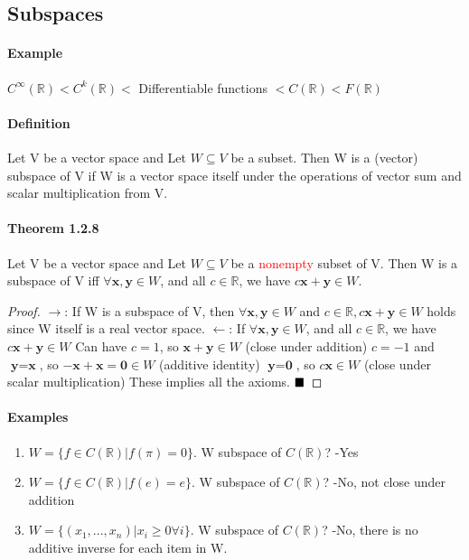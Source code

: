 \documentclass[11pt]{article}
\newcommand{\tb}[1]{\textbf{#1}}
\newcommand{\qed}[0]{$\hfill\blacksquare$}
\newcommand{\real}[0]{\mathbb{R}}
\newcommand{\vx}[0]{\tb{x}}
\newcommand{\vy}[0]{\tb{y}}
\newcommand{\vo}[0]{\tb{0}}
\begin{document}
	\subsection{Subspaces}
	\paragraph{Example}
	$C^\infty(\real) < C^k(\real) <$ Differentiable functions $< C(\real) < F(\real)$  
	\paragraph{Definition} Let V be a vector space and Let $W \subseteq V$ be a subset. Then W is a (vector) subspace of V if W is a vector space itself under the operations of vector sum and scalar multiplication from V.
	\paragraph{Theorem 1.2.8}  Let V be a vector space and Let $W \subseteq V$ be a \textcolor{red}{nonempty} subset of V. Then W is a subspace of V iff $\forall \vx, \vy \in W$, and all $c \in \real$, we have $c\vx + \vy \in W$. \newline
	\begin{proof}
	$\rightarrow$: If W is a subspace of V, then $\forall \vx, \vy \in W$ and $c \in \real, c\vx + \vy \in W$ holds since W itself is a real vector space. \newline
	$\leftarrow$: If $\forall \vx, \vy \in W$, and all $c \in \real$, we have $c\vx + \vy \in W$ \newline
	Can have $c = 1$, so $\vx + \vy \in W$ (close under addition) \newline
	$c = -1$ and $\vy = \vx$, so $-\vx + \vx = \vo \in W$ (additive identity) \newline
	$\vy = \vo$, so  $c\vx \in W$ (close under scalar multiplication) \newline
	These implies all the axioms. \qed
	\end{proof}

	\paragraph{Examples}
	\begin{enumerate}
		\item $W = \{f\in C(\real) | f(\pi) = 0\}$. W subspace of $C(\real)$? -Yes
		\item $W = \{f\in C(\real) | f(e) = e\}$. W subspace of $C(\real)$? -No, not close under addition
		\item $W = \{(x_1,...,x_n) | x_i\geq 0 \forall i\}$. W subspace of $C(\real)$? -No, there is no additive inverse for each item in W.
	\end{enumerate}
\end{document}
